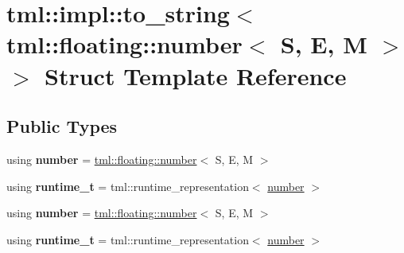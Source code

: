\hypertarget{structtml_1_1impl_1_1to__string_3_01tml_1_1floating_1_1number_3_01S_00_01E_00_01M_01_4_01_4}{\section{tml\+:\+:impl\+:\+:to\+\_\+string$<$ tml\+:\+:floating\+:\+:number$<$ S, E, M $>$ $>$ Struct Template Reference}
\label{structtml_1_1impl_1_1to__string_3_01tml_1_1floating_1_1number_3_01S_00_01E_00_01M_01_4_01_4}
}
\subsection*{Public Types}
\begin{DoxyCompactItemize}
\item 
\hypertarget{structtml_1_1impl_1_1to__string_3_01tml_1_1floating_1_1number_3_01S_00_01E_00_01M_01_4_01_4_ac234af4ae6b0fd549fa2fd5d270c9ece}{using {\bfseries number} = \hyperlink{structtml_1_1floating_1_1number}{tml\+::floating\+::number}$<$ S, E, M $>$}\label{structtml_1_1impl_1_1to__string_3_01tml_1_1floating_1_1number_3_01S_00_01E_00_01M_01_4_01_4_ac234af4ae6b0fd549fa2fd5d270c9ece}

\item 
\hypertarget{structtml_1_1impl_1_1to__string_3_01tml_1_1floating_1_1number_3_01S_00_01E_00_01M_01_4_01_4_a054aa27e20382cf499ed48518d9c0183}{using {\bfseries runtime\+\_\+t} = tml\+::runtime\+\_\+representation$<$ \hyperlink{structtml_1_1floating_1_1number}{number} $>$}\label{structtml_1_1impl_1_1to__string_3_01tml_1_1floating_1_1number_3_01S_00_01E_00_01M_01_4_01_4_a054aa27e20382cf499ed48518d9c0183}

\item 
\hypertarget{structtml_1_1impl_1_1to__string_3_01tml_1_1floating_1_1number_3_01S_00_01E_00_01M_01_4_01_4_ac234af4ae6b0fd549fa2fd5d270c9ece}{using {\bfseries number} = \hyperlink{structtml_1_1floating_1_1number}{tml\+::floating\+::number}$<$ S, E, M $>$}\label{structtml_1_1impl_1_1to__string_3_01tml_1_1floating_1_1number_3_01S_00_01E_00_01M_01_4_01_4_ac234af4ae6b0fd549fa2fd5d270c9ece}

\item 
\hypertarget{structtml_1_1impl_1_1to__string_3_01tml_1_1floating_1_1number_3_01S_00_01E_00_01M_01_4_01_4_a054aa27e20382cf499ed48518d9c0183}{using {\bfseries runtime\+\_\+t} = tml\+::runtime\+\_\+representation$<$ \hyperlink{structtml_1_1floating_1_1number}{number} $>$}\label{structtml_1_1impl_1_1to__string_3_01tml_1_1floating_1_1number_3_01S_00_01E_00_01M_01_4_01_4_a054aa27e20382cf499ed48518d9c0183}

\end{DoxyCompactItemize}
